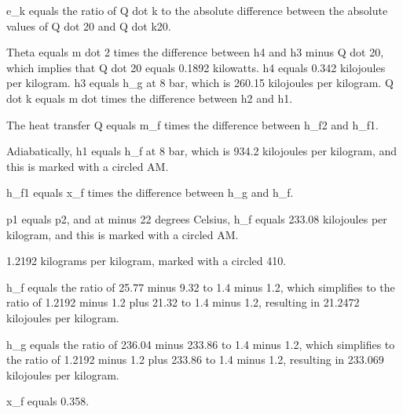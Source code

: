 e_k equals the ratio of Q dot k to the absolute difference between the absolute values of Q dot 20 and Q dot k20.

Theta equals m dot 2 times the difference between h4 and h3 minus Q dot 20, which implies that Q dot 20 equals 0.1892 kilowatts. h4 equals 0.342 kilojoules per kilogram. h3 equals h_g at 8 bar, which is 260.15 kilojoules per kilogram. Q dot k equals m dot times the difference between h2 and h1.

The heat transfer Q equals m_f times the difference between h_f2 and h_f1.

Adiabatically, h1 equals h_f at 8 bar, which is 934.2 kilojoules per kilogram, and this is marked with a circled AM.

h_f1 equals x_f times the difference between h_g and h_f.

p1 equals p2, and at minus 22 degrees Celsius, h_f equals 233.08 kilojoules per kilogram, and this is marked with a circled AM.

1.2192 kilograms per kilogram, marked with a circled 410.

h_f equals the ratio of 25.77 minus 9.32 to 1.4 minus 1.2, which simplifies to the ratio of 1.2192 minus 1.2 plus 21.32 to 1.4 minus 1.2, resulting in 21.2472 kilojoules per kilogram.

h_g equals the ratio of 236.04 minus 233.86 to 1.4 minus 1.2, which simplifies to the ratio of 1.2192 minus 1.2 plus 233.86 to 1.4 minus 1.2, resulting in 233.069 kilojoules per kilogram.

x_f equals 0.358.